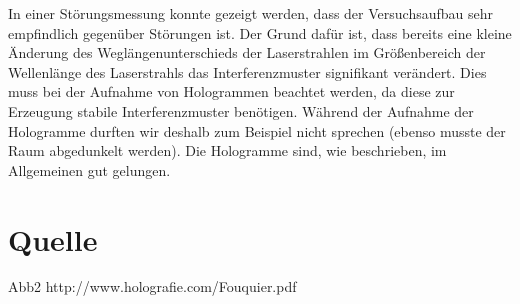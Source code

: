 \documentclass[12pt,a4paper]{article}
\begin{document}
In einer Störungsmessung konnte gezeigt werden, dass der Versuchsaufbau sehr empfindlich gegenüber Störungen ist. Der Grund dafür ist, dass bereits eine kleine Änderung des Weglängenunterschieds der Laserstrahlen im Größenbereich der Wellenlänge des Laserstrahls das Interferenzmuster signifikant verändert. Dies muss bei der Aufnahme von Hologrammen beachtet werden, da diese zur Erzeugung stabile Interferenzmuster benötigen.
Während der Aufnahme der Hologramme durften wir deshalb zum Beispiel nicht sprechen (ebenso musste der Raum abgedunkelt werden). Die Hologramme sind, wie beschrieben, im Allgemeinen gut gelungen.


\section{Quelle}

Abb2 http://www.holografie.com/Fouquier.pdf
\end{document}
